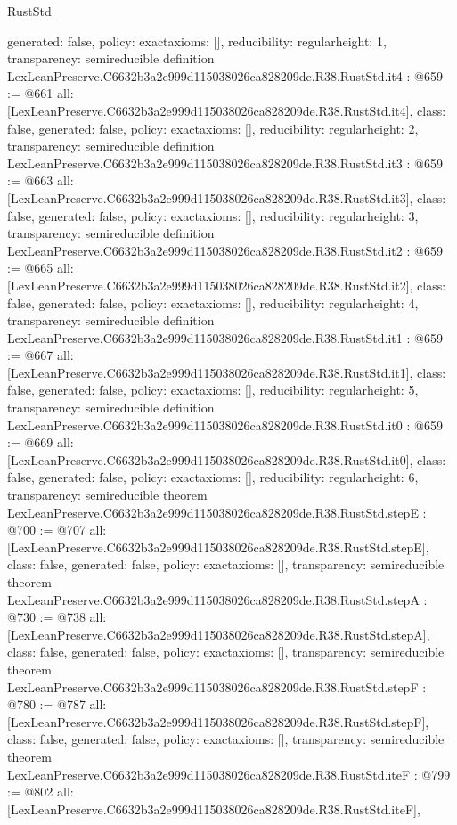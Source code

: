 \begin{lexlean}{RustStd}
\begin{coremodule}
{  generated: false,
  policy: exact{axioms: []},
  reducibility: regular{height: 1},
  transparency: semireducible
}
definition LexLeanPreserve.C6632b3a2e999d115038026ca828209de.R38.RustStd.it4 : @659 := @661 {
  all: [LexLeanPreserve.C6632b3a2e999d115038026ca828209de.R38.RustStd.it4],
  class: false,
  generated: false,
  policy: exact{axioms: []},
  reducibility: regular{height: 2},
  transparency: semireducible
}
definition LexLeanPreserve.C6632b3a2e999d115038026ca828209de.R38.RustStd.it3 : @659 := @663 {
  all: [LexLeanPreserve.C6632b3a2e999d115038026ca828209de.R38.RustStd.it3],
  class: false,
  generated: false,
  policy: exact{axioms: []},
  reducibility: regular{height: 3},
  transparency: semireducible
}
definition LexLeanPreserve.C6632b3a2e999d115038026ca828209de.R38.RustStd.it2 : @659 := @665 {
  all: [LexLeanPreserve.C6632b3a2e999d115038026ca828209de.R38.RustStd.it2],
  class: false,
  generated: false,
  policy: exact{axioms: []},
  reducibility: regular{height: 4},
  transparency: semireducible
}
definition LexLeanPreserve.C6632b3a2e999d115038026ca828209de.R38.RustStd.it1 : @659 := @667 {
  all: [LexLeanPreserve.C6632b3a2e999d115038026ca828209de.R38.RustStd.it1],
  class: false,
  generated: false,
  policy: exact{axioms: []},
  reducibility: regular{height: 5},
  transparency: semireducible
}
definition LexLeanPreserve.C6632b3a2e999d115038026ca828209de.R38.RustStd.it0 : @659 := @669 {
  all: [LexLeanPreserve.C6632b3a2e999d115038026ca828209de.R38.RustStd.it0],
  class: false,
  generated: false,
  policy: exact{axioms: []},
  reducibility: regular{height: 6},
  transparency: semireducible
}
theorem LexLeanPreserve.C6632b3a2e999d115038026ca828209de.R38.RustStd.stepE : @700 := @707 {
  all: [LexLeanPreserve.C6632b3a2e999d115038026ca828209de.R38.RustStd.stepE],
  class: false,
  generated: false,
  policy: exact{axioms: []},
  transparency: semireducible
}
theorem LexLeanPreserve.C6632b3a2e999d115038026ca828209de.R38.RustStd.stepA : @730 := @738 {
  all: [LexLeanPreserve.C6632b3a2e999d115038026ca828209de.R38.RustStd.stepA],
  class: false,
  generated: false,
  policy: exact{axioms: []},
  transparency: semireducible
}
theorem LexLeanPreserve.C6632b3a2e999d115038026ca828209de.R38.RustStd.stepF : @780 := @787 {
  all: [LexLeanPreserve.C6632b3a2e999d115038026ca828209de.R38.RustStd.stepF],
  class: false,
  generated: false,
  policy: exact{axioms: []},
  transparency: semireducible
}
theorem LexLeanPreserve.C6632b3a2e999d115038026ca828209de.R38.RustStd.iteF : @799 := @802 {
  all: [LexLeanPreserve.C6632b3a2e999d115038026ca828209de.R38.RustStd.iteF],
}
\end{coremodule}
\end{lexlean}
